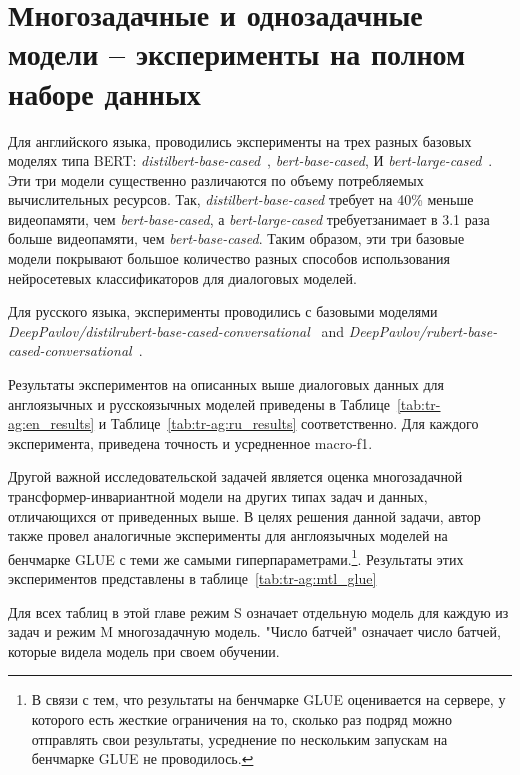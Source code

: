 \section{Многозадачные и однозадачные модели -- эксперименты на полном наборе данных} 
Для английского языка, проводились эксперименты на трех разных базовых моделях типа BERT: \textit{distilbert-base-cased}~\cite{distilbert}, \textit{bert-base-cased}, И \textit{bert-large-cased}~\cite{bert}.  Эти три модели существенно различаются по объему потребляемых вычислительных ресурсов. Так, 
\textit{distilbert-base-cased} требует на 40\% меньше видеопамяти, чем \textit{bert-base-cased}, а \textit{bert-large-cased} требуетзанимает в  3.1 раза больше видеопамяти, чем \textit{bert-base-cased}. Таким образом, эти три базовые модели покрывают большое количество разных способов использования нейросетевых классификаторов для диалоговых моделей. 

Для русского языка, эксперименты проводились с базовыми моделями \textit{DeepPavlov/distilrubert-base-cased-conversational}~\cite{distilrubert} and \textit{DeepPavlov/rubert-base-cased-conversational}~\cite{rubert}.

Результаты экспериментов на описанных выше диалоговых данных для англоязычных и русскоязычных моделей приведены в Таблице~\ref{tab:tr-ag:en_results} и Таблице~\ref{tab:tr-ag:ru_results} соответственно. Для каждого эксперимента, приведена точность и усредненное macro-f1.

Другой важной исследовательской задачей является оценка многозадачной трансформер-инвариантной модели на других типах задач и данных, отличающихся от приведенных выше. В целях решения данной задачи, автор также провел аналогичные эксперименты для англоязычных моделей на бенчмарке GLUE\cite{wang_2018} с теми же самыми гиперпараметрами.\footnote{В связи с тем, что результаты на бенчмарке GLUE оценивается на сервере, у которого есть жесткие ограничения на то, сколько раз подряд можно отправлять свои результаты, усреднение по нескольким запускам на бенчмарке GLUE не проводилось.}. Результаты этих экспериментов представлены в таблице~\ref{tab:tr-ag:mtl_glue}

Для всех таблиц в этой главе режим S означает отдельную модель для каждую из задач и режим M многозадачную модель. "Число батчей" означает число батчей, которые видела модель при своем обучении.

